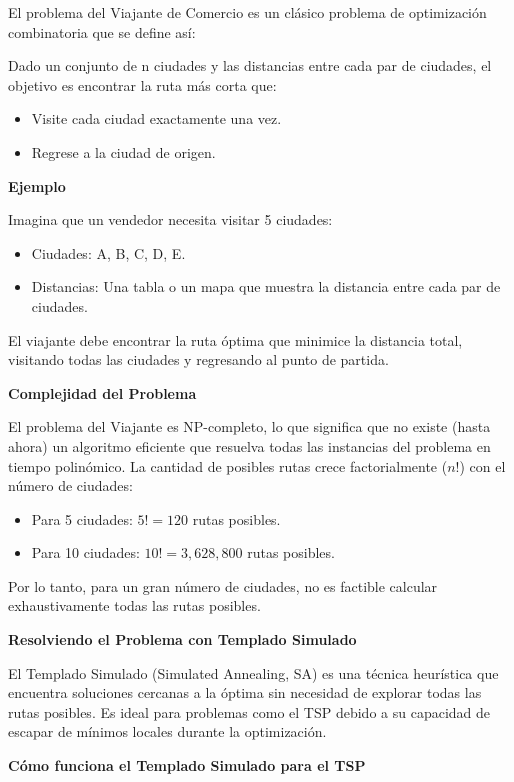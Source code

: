 \documentclass{article}
\begin{document}
El problema del Viajante de Comercio es un clásico problema de optimización combinatoria que se define así:

Dado un conjunto de n ciudades y las distancias entre cada par de ciudades, el objetivo es encontrar la ruta más corta que:
\begin{itemize}
    \item Visite cada ciudad exactamente una vez.
    \item Regrese a la ciudad de origen.
\end{itemize}

\textbf{Ejemplo}

Imagina que un vendedor necesita visitar 5 ciudades:

\begin{itemize}
    \item Ciudades: A, B, C, D, E.
    \item Distancias: Una tabla o un mapa que muestra la distancia entre cada par de ciudades.
\end{itemize}

El viajante debe encontrar la ruta óptima que minimice la distancia total, visitando todas las ciudades y regresando al punto de partida.

\textbf{Complejidad del Problema}

El problema del Viajante es NP-completo, lo que significa que no existe (hasta ahora) un algoritmo eficiente que resuelva todas las instancias del problema en tiempo polinómico. La cantidad de posibles rutas crece factorialmente (\(n!\)) con el número de ciudades:

\begin{itemize}
    \item Para 5 ciudades: \(5! = 120\) rutas posibles.
    \item Para 10 ciudades: \(10! = 3,628,800\) rutas posibles.
\end{itemize}

Por lo tanto, para un gran número de ciudades, no es factible calcular exhaustivamente todas las rutas posibles.

\textbf{Resolviendo el Problema con Templado Simulado}

El Templado Simulado (Simulated Annealing, SA) es una técnica heurística que encuentra soluciones cercanas a la óptima sin necesidad de explorar todas las rutas posibles. Es ideal para problemas como el TSP debido a su capacidad de escapar de mínimos locales durante la optimización.

\textbf{Cómo funciona el Templado Simulado para el TSP}
\end{document}
